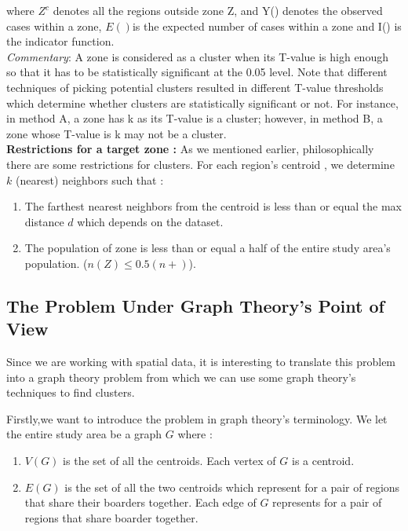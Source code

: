 \documentclass[12pt]{article}
\begin{document}
				where $ Z^c$ denotes all the regions outside zone Z, and Y() denotes the observed cases within a zone, $E()$is the expected number of cases within a zone and I() is the indicator function. \\ 
			
			 \textit{Commentary}: A zone is considered as a cluster when its T-value is high enough so that it has to be statistically significant at the 0.05 level. Note that different techniques of picking potential clusters resulted in different T-value thresholds which determine whether clusters are statistically significant or not. For instance, in  method A, a zone has k as its T-value is a cluster; however, in method B, a zone whose T-value is k may not be a cluster.  \\
			
			\textbf{Restrictions for a target zone : } As we mentioned earlier, philosophically there are some restrictions for clusters. For each region's centroid , we determine $k$ (nearest) neighbors such that : \\
				\begin{enumerate}
					\item The farthest nearest neighbors from the centroid is less than or equal the max distance $d$ which depends on the dataset. \\ 
					\item The population of zone is less than or equal a half of the entire study area's population. ($n(Z) \leq 0.5(n+)$).\\
				\end{enumerate}
			
				\subsection{The Problem Under Graph Theory's Point of View} 
				
				Since we are working with spatial data, it is interesting to translate this problem into a graph theory problem from which we can use some graph theory's techniques to find clusters. 
				
				Firstly,we want to introduce the problem in graph theory's terminology. We let the entire study area be a graph $G$ where : \\
				\begin{enumerate}
					
				\item $V(G)$ is the set of all the centroids. Each vertex of $G$ is a centroid. \\
				\item $E(G)$ is the set of all the two centroids which represent for a pair of regions that share their boarders together. Each edge of $G$ represents for a pair of regions that share boarder together.\\
				\end{enumerate}
				
\end{document}
